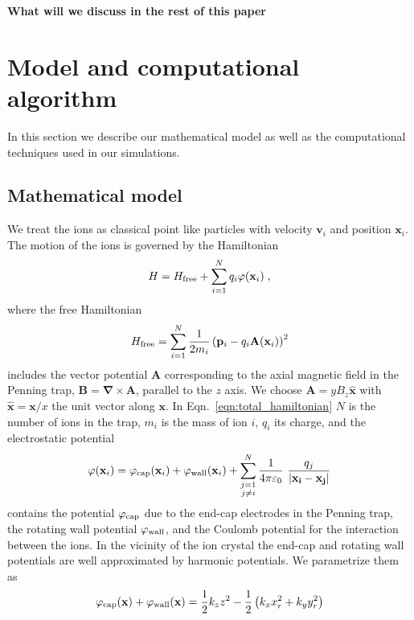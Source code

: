 \documentclass[aps, pra, preprint]{revtex4-1}
\newcommand{\hfree}{H_{\rm free}}
\newcommand{\phicap}{\varphi_{\rm cap}}
\newcommand{\phiwall}{\varphi_{\rm wall}}
\begin{document}
{\bf What will we discuss in the rest of this paper}


\section{Model and computational algorithm}

In this section we describe our mathematical model as well as the
computational techniques used in our simulations.


\subsection{Mathematical model}

We treat the ions as classical point like particles with 
velocity $\mathbf{v}_i$ and position $\mathbf{x}_i$. The motion
of the ions is governed by the Hamiltonian
\begin{equation}
  H = \hfree + \sum_{i=1}^N q_i\varphi(\mathbf{x}_i)\;,
\end{equation}
where the free Hamiltonian
\begin{equation}
  \hfree =
  \sum_{i=1}^N \frac{1}{2m_i}\left(
    \mathbf{p}_i -
    q_i\mathbf{A}(\mathbf{x}_i) \right)^2 
  \label{eqn:total_hamiltonian}
\end{equation}
includes the vector potential $\mathbf{A}$ corresponding to the
axial magnetic field in the Penning trap, $\mathbf{B} =
\mathbf{\nabla}\times \mathbf{A}$, parallel to the $z$ axis. We
choose $\mathbf{A} = yB_z\mathbf{\hat x}$ with $\mathbf{\hat
  x}=\mathbf{x}/x$ the unit vector along $\mathbf{x}$. In
Eqn.~\eqref{eqn:total_hamiltonian} $N$ is the number of ions in
the trap, $m_i$ is the mass of ion $i$, $q_i$ its charge, and the
electrostatic potential
\begin{equation}
  \varphi(\mathbf{x}_i) =
  \phicap(\mathbf{x}_i) +
  \phiwall(\mathbf{x}_i) +
  \sum_{\substack{j=1\\j\neq i}}^N
  \frac{1}{4\pi\varepsilon_0}\
  \frac{q_j}{\left| \mathbf{x_i} - \mathbf{x_j} \right|}
\end{equation}
contains the potential $\phicap$ due to the end-cap electrodes in
the Penning trap, the rotating wall potential $\phiwall$, and the
Coulomb potential for the interaction between the ions. In the
vicinity of the ion crystal the end-cap and rotating wall
potentials are well approximated by harmonic potentials. We
parametrize them as
\begin{equation}
  \phicap(\mathbf{x}) +\phiwall(\mathbf{x}) =\frac{1}{2}k_z z^2 - 
\frac{1}{2} \left(k_x x_r^2 + k_y y_r^2\right)
\end{equation}
\end{document}

